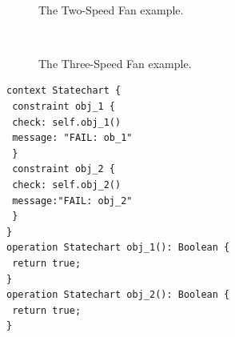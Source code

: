 \documentclass[10pt, a4paper]{report} \usepackage[titletoc]{appendix}
\begin{document}
\begin{figure}[t!]
 \centering
 \\
	\caption{The Two-Speed Fan example.}
 \label{example-02}
\end{figure}

\begin{figure}[t!]
 \centering
 \\
	\caption{The Three-Speed Fan example.}
 \label{example-03}
\end{figure}


\begin{lstlisting}[style=interfaces,caption={Validation template for objectives in One-Speed Fan activity/level.},label=validation-template]
context Statechart {
 constraint obj_1 {
 check: self.obj_1()
 message: "FAIL: ob_1"
 }
 constraint obj_2 {
 check: self.obj_2()
 message:"FAIL: obj_2"
 }
}
operation Statechart obj_1(): Boolean {
 return true;
}
operation Statechart obj_2(): Boolean {
 return true;
}
\end{lstlisting} 
\end{document}
